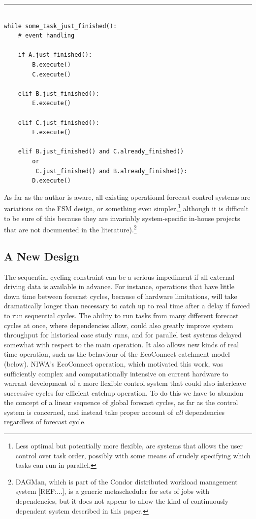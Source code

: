 \documentclass[11pt,a4paper]{article}
\begin{document}
{\small
\noindent
\rule{5cm}{.2mm}
\begin{lstlisting} 

while some_task_just_finished():
    # event handling

    if A.just_finished():
        B.execute()
        C.execute()

    elif B.just_finished():
        E.execute()

    elif C.just_finished():
        F.execute()

    elif B.just_finished() and C.already_finished()
        or
         C.just_finished() and B.already_finished(): 
        D.execute()

\end{lstlisting}
}

As far as the author is aware, all existing operational forecast control
systems are variations on the FSM design, or something even
simpler,\footnote{Less optimal but potentially more flexible, are
systems that allows the user control over task order, possibly with some
means of crudely specifying which tasks can run in parallel.} although
it is difficult to be sure of this because they are invariably
system-specific in-house projects that are not documented in the
literature).\footnote{DAGMan, which is part of the Condor distributed
workload management system [REF:...], is a generic metascheduler for
sets of jobs with dependencies, but it does not appear to allow the kind
of continuously dependent system described in this paper.} 

\subsection{A New Design}

The sequential cycling constraint can be a serious impediment if all
external driving data is available in advance.  For instance,
operations that have little down time between forecast cycles, because
of hardware limitations, will take dramatically longer than necessary to
catch up to real time after a delay if forced to run sequential cycles.
The ability to run tasks from many different forecast cycles at once,
where dependencies allow, could also greatly improve system throughput
for historical case study runs, and for parallel test systems delayed
somewhat with respect to the main operation. It also allows new kinds of
real time operation, such as the behaviour of the EcoConnect catchment
model (below). NIWA's EcoConnect operation, which motivated this work,
was sufficiently complex and computationally intensive on current
hardware to warrant development of a more flexible control system that
could also interleave successive cycles for efficient catchup operation.
To do this we have to abandon the concept of a linear sequence of global
forecast cycles, as far as the control system is concerned, and instead
take proper account of {\em all} dependencies regardless of forecast
cycle. 
\end{document}
